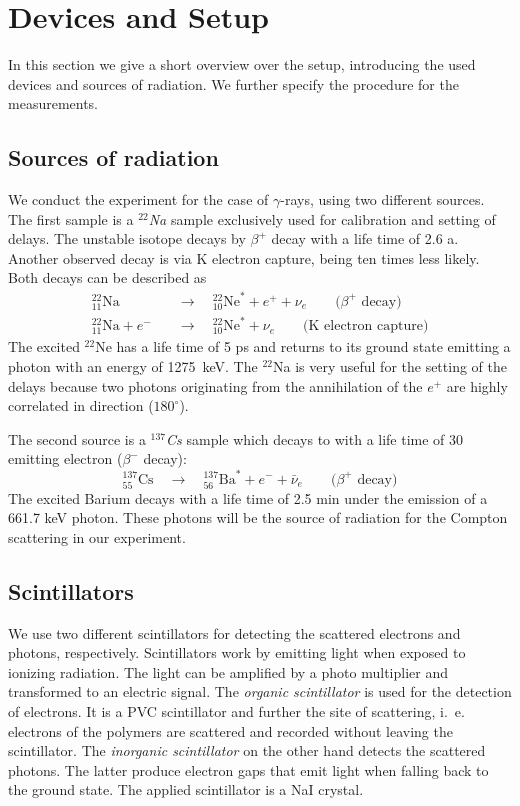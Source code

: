 \section{Devices and Setup}
In this section we give a short overview over the setup, introducing the used devices and sources of radiation. We
further specify the procedure for the measurements. 

\subsection{Sources of radiation}
\label{sec:sources}
We conduct the experiment for the case of $\gamma$-rays, using two different sources. The first sample is a 
\textit{$^{22}$Na}  sample exclusively used for calibration and setting of delays. The unstable isotope decays by 
$\beta^+$ decay with a life time of 2.6 a. Another observed decay is via K electron capture, being ten times less likely. 
Both decays can be described as
\begin{align}
_{11}^{22}\text{Na}        \quad &\rightarrow \quad _{10}^{22}\text{Ne}^* + e^+ + \nu_e	\qquad \text{($\beta^+$ decay)} \\
_{11}^{22}\text{Na} + e^-  \quad &\rightarrow \quad _{10}^{22}\text{Ne}^* + \nu_e  \qquad \text{(K electron capture)}
    \label{eq:22na_decay}
\end{align}
The excited $^{22}$Ne has a life time of 5 ps and returns to its ground state emitting a photon with an energy of 
1275~keV.\cite{lnhb} The $^{22}$Na is very useful for the setting of the delays because two photons originating from the 
annihilation of the $e^+$ are highly correlated in direction ($180^\circ$).\cite{ver}

The second source is a \textit{$^{137}$Cs} sample which decays to with a life time of 30 emitting electron 
($\beta^-$ decay):
\begin{equation}
_{55}^{137}\text{Cs} \quad \rightarrow \quad _{56}^{137}\text{Ba}^* + e^- + \bar{\nu}_e \qquad \text{($\beta^+$ decay)}
    \label{eq:137cs_decay}
\end{equation}
The excited Barium decays with a life time of 2.5 min under the emission of a 661.7 keV photon. These photons will be the 
source of radiation for the Compton scattering in our experiment.

\subsection{Scintillators}
\label{sec:scinti}
We use two different scintillators for detecting the scattered electrons and photons, respectively. Scintillators work by 
emitting light when exposed to ionizing radiation. The light can be amplified by a photo multiplier and transformed to an 
electric signal. 
The \textit{organic scintillator} is used for the detection of electrons. It is a PVC scintillator and further the site of 
scattering, i.~e. electrons of the polymers are scattered and recorded without leaving the scintillator. The 
\textit{inorganic scintillator} on the other hand detects the scattered photons. The latter produce electron gaps that 
emit light when falling back to the ground state. The applied scintillator is a NaI crystal. 
